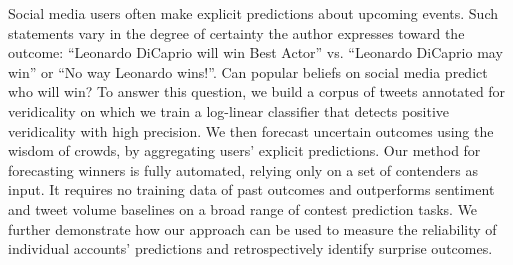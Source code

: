 Social media users often make explicit predictions about upcoming events. Such statements vary in the degree of certainty the author expresses toward the outcome: ``Leonardo DiCaprio will win Best Actor'' vs. ``Leonardo DiCaprio may win'' or ``No way Leonardo wins!''. Can popular beliefs on social media predict who will win? To answer this question, we build a corpus of tweets annotated for veridicality on which we train a log-linear classifier that detects positive veridicality with high precision. We then forecast uncertain outcomes using the wisdom of crowds, by aggregating users' explicit predictions. Our method for forecasting winners is fully automated, relying only on a set of contenders as input. It requires no training data of past outcomes and outperforms sentiment and tweet volume baselines on a broad range of contest prediction tasks. We further demonstrate how our approach can be used to measure the reliability of individual accounts' predictions and retrospectively identify surprise outcomes.
